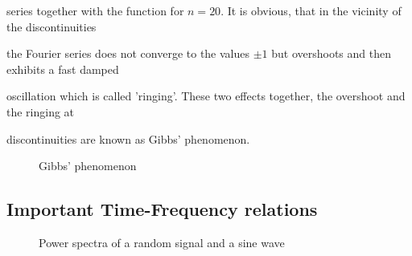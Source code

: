 series together with the function for $n=20$. It is obvious, that in the vicinity of the discontinuities

the Fourier series does not converge to the values $\pm 1$ but overshoots and then exhibits a fast damped 

oscillation which is called 'ringing'. These two effects together, the overshoot and the ringing at 

discontinuities are known as Gibbs' phenomenon.





\begin{figure}[!ht]

    \centerline{\epsfxsize=12cm \epsfysize=8cm } \svs

    \caption{Gibbs' phenomenon} \label{fig56}

\end{figure}



\subsection{Important Time-Frequency relations}



\begin{figure}[!h]

    \centerline{\epsfxsize=12cm  }

    \caption{Power spectra of a random signal and a sine wave} \label{fig57}

\end{figure}



\newpage

